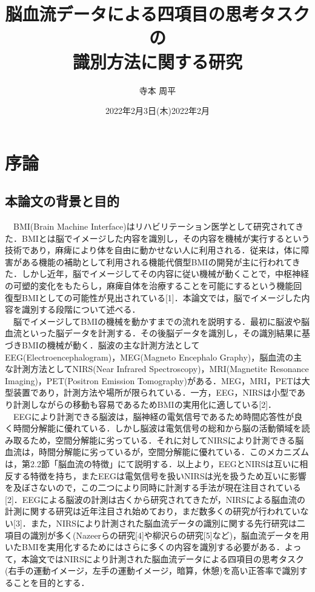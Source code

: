\documentclass[a4j,12pt]{jreport}
\date{2022年2月3日(木)}
\title{脳血流データによる四項目の思考タスクの\\識別方法に関する研究}
\author{寺本 周平}
\date{2022年2月}
\begin{document}
\maketitle
\tableofcontents
\chapter{序論}
\section{本論文の背景と目的}
　BMI(Brain Machine Interface)はリハビリテーション医学として研究されてきた．BMIとは脳でイメージした内容を識別し，その内容を機械が実行するという技術であり，麻痺により体を自由に動かせない人に利用される．従来は，体に障害がある機能の補助として利用される機能代償型BMIの開発が主に行われてきた．しかし近年，脳でイメージしてその内容に従い機械が動くことで，中枢神経の可塑的変化をもたらし，麻痺自体を治療することを可能にするという機能回復型BMIとしての可能性が見出されている[1]．本論文では，脳でイメージした内容を識別する段階について述べる．\\
　脳でイメージしてBMIの機械を動かすまでの流れを説明する．最初に脳波や脳血流といった脳データを計測する．その後脳データを識別し，その識別結果に基づきBMIの機械が動く．脳波の主な計測方法としてEEG(Electroencephalogram)，MEG(Magneto Encephalo Graphy)，脳血流の主な計測方法としてNIRS(Near Infrared Spectroscopy)，MRI(Magnetite Resonance Imaging)，PET(Positron Emission Tomography)がある．MEG，MRI，PETは大型装置であり，計測方法や場所が限られている．一方，EEG，NIRSは小型であり計測しながらの移動も容易であるためBMIの実用化に適している[2]．\\
　EEGにより計測できる脳波は，脳神経の電気信号であるため時間応答性が良く時間分解能に優れている．しかし脳波は電気信号の総和から脳の活動領域を読み取るため，空間分解能に劣っている．それに対してNIRSにより計測できる脳血流は，時間分解能に劣っているが，空間分解能に優れている．このメカニズムは，第2.2節「脳血流の特徴」にて説明する．以上より，EEGとNIRSは互いに相反する特徴を持ち，またEEGは電気信号を扱いNIRSは光を扱うため互いに影響を及ぼさないので，この二つにより同時に計測する手法が現在注目されている[2]．EEGによる脳波の計測は古くから研究されてきたが，NIRSによる脳血流の計測に関する研究は近年注目され始めており，まだ数多くの研究が行われていない[3]．また，NIRSにより計測された脳血流データの識別に関する先行研究は二項目の識別が多く(Nazeerらの研究[4]や柳沢らの研究[5]など)，脳血流データを用いたBMIを実用化するためにはさらに多くの内容を識別する必要がある．よって，本論文ではNIRSにより計測された脳血流データによる四項目の思考タスク(右手の運動イメージ，左手の運動イメージ，暗算，休憩)を高い正答率で識別することを目的とする．\\
\end{document}
